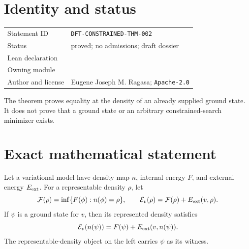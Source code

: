 
\section{Identity and status}
\begin{tabularx}{\textwidth}{@{}lY@{}}
\toprule
Statement ID & \texttt{DFT-CONSTRAINED-THM-002} \\
Status & proved; no admissions; draft dossier \\
Lean declaration &  \\
Owning module &  \\
Author and license & Eugene Joseph M. Ragasa; \texttt{Apache-2.0} \\
\bottomrule
\end{tabularx}
The theorem proves equality at the density of an already supplied ground state.  It does not prove
that a ground state or an arbitrary constrained-search minimizer exists.

\section{Exact mathematical statement}
Let a variational model have density map \(n\), internal energy \(F\), and external energy
\(E_{\rm ext}\).  For a representable density \(\rho\), let
\[
 \mathcal F(\rho)=\inf\{F(\phi):n(\phi)=\rho\},\qquad
 \mathcal E_v(\rho)=\mathcal F(\rho)+E_{\rm ext}(v,\rho).
\]
If \(\psi\) is a ground state for \(v\), then its represented density satisfies
\[
 \mathcal E_v(n(\psi))
 =F(\psi)+E_{\rm ext}(v,n(\psi)).
\]
The representable-density object on the left carries \(\psi\) as its witness.

